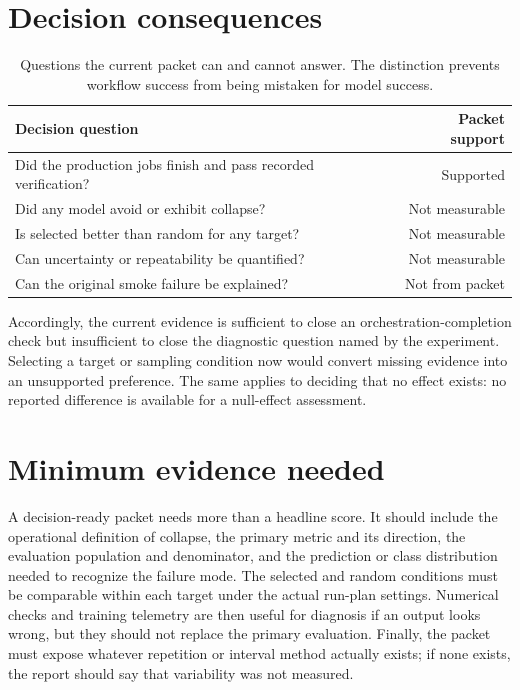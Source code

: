 \documentclass[10pt,twocolumn,letterpaper]{article}
\begin{document}
\section{Decision consequences}
\begin{table}[H]\centering\normalsize
\caption{Questions the current packet can and cannot answer. The distinction prevents workflow success from being mistaken for model success.}
\begin{tabularx}{\columnwidth}{@{}Xr@{}}
\toprule
Decision question & Packet support \\ \midrule
Did the production jobs finish and pass recorded verification? & Supported \\
Did any model avoid or exhibit collapse? & Not measurable \\
Is selected better than random for any target? & Not measurable \\
Can uncertainty or repeatability be quantified? & Not measurable \\
Can the original smoke failure be explained? & Not from packet \\
\bottomrule\end{tabularx}\end{table}
Accordingly, the current evidence is sufficient to close an orchestration-completion check but insufficient to close the diagnostic question named by the experiment. Selecting a target or sampling condition now would convert missing evidence into an unsupported preference. The same applies to deciding that no effect exists: no reported difference is available for a null-effect assessment.

\section{Minimum evidence needed}
A decision-ready packet needs more than a headline score. It should include the operational definition of collapse, the primary metric and its direction, the evaluation population and denominator, and the prediction or class distribution needed to recognize the failure mode. The selected and random conditions must be comparable within each target under the actual run-plan settings. Numerical checks and training telemetry are then useful for diagnosis if an output looks wrong, but they should not replace the primary evaluation. Finally, the packet must expose whatever repetition or interval method actually exists; if none exists, the report should say that variability was not measured.
\end{document}
